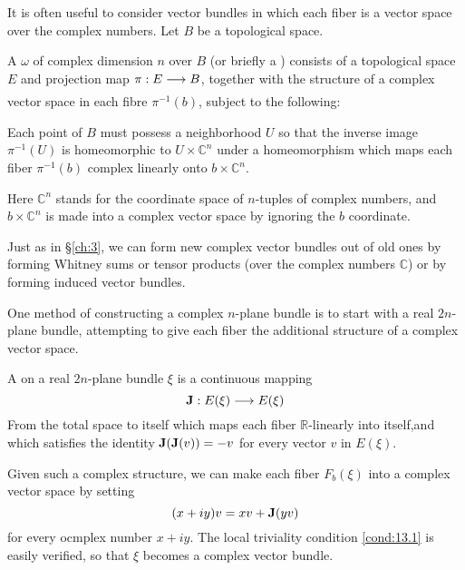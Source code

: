 \documentclass[../main]{subfiles}
\begin{document}
It is often useful to consider vector bundles in which each fiber is a
vector space over the complex numbers. Let $B$ be a topological space. 

\begin{definition}
A  $\omega$ of complex dimension $n$ over $B$ (or briefly a ) consists of a topological space $E$ and projection map $\pi:E\varrightarrow{}B$, together with the structure of a complex vector space in each fibre $\pi^{-1}(b)$, subject to the following:

\renewcommand{\thecondition}{\thechapter.\arabic{condition}}
\begin{condition}\label{cond:13.1}
Each point of $B$ must possess a neighborhood $U$ so that the inverse image $\pi^{-1}(U)$ is homeomorphic to $U\times \mathbb{C}^n$ under a homeomorphism which maps each fiber $\pi^{-1}(b)$ complex linearly onto $b\times \mathbb{C}^n$.
\end{condition}\renewcommand{\thecondition}{\arabic{condition}}
Here $\mathbb{C}^n$ stands for the coordinate space of $n$-tuples of complex numbers, and $b\times \mathbb{C}^n$ is made into a complex vector space by ignoring the $b$ coordinate.
\end{definition}
Just as in \S\ref{ch:3}, we can form new complex vector bundles out of old ones by forming Whitney sums or tensor products (over the complex numbers $\mathbb{C}$) or by forming induced vector bundles.

One method of constructing a complex $n$-plane bundle is to start with
a real $2n$-plane bundle, attempting to give each fiber the additional structure of a complex vector space. 

\begin{definition}
A  on a real $2n$-plane bundle $\xi$ is a continuous mapping 
\[\mathbf{J}: E(\xi)\longrightarrow E(\xi)\]
From the total space to itself which maps each fiber $\mathbb{R}$-linearly into itself,and which satisfies the identity $\mathbf{J}(\mathbf{J}(v))=-v$ for every vector $v$ in $E(\xi)$.

\end{definition}

Given such a complex structure, we can make each fiber $F_b(\xi)$ into a complex vector space by setting 
\[(x+iy)v= xv+\mathbf{J}(yv)\]
for every ocmplex number $x+iy$. The local triviality condition \ref{cond:13.1} is easily verified, so that $\xi$ becomes a complex vector bundle.
\end{document}
